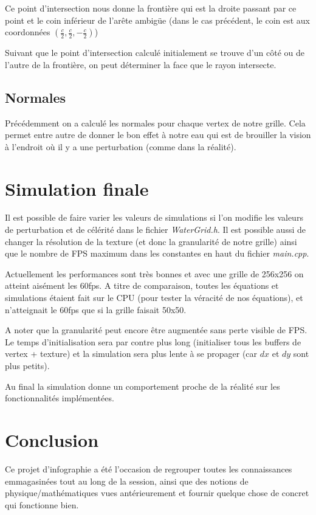 \documentclass[a4paper,11pt,leqno]{article}
\begin{document}
Ce point d'intersection nous donne la frontière qui est la droite passant par ce point et le coin inférieur de l'arête ambigüe (dans le cas précédent, le coin est aux coordonnées $(\frac{c}{2}, \frac{c}{2}, -\frac{c}{2})$)

Suivant que le point d'intersection calculé initialement se trouve d'un côté ou de l'autre de la frontière, on peut déterminer la face que le rayon intersecte.

\subsection{Normales}

Précédemment on a calculé les normales pour chaque vertex de notre grille. Cela permet entre autre de donner le bon effet à notre eau qui est de brouiller la vision à l'endroit où il y a une perturbation (comme dans la réalité).

\section{Simulation finale}

Il est possible de faire varier les valeurs de simulations si l'on modifie les valeurs de perturbation et de célérité dans le fichier \emph{WaterGrid.h}. Il est possible aussi de changer la résolution de la texture (et donc la granularité de notre grille) ainsi que le nombre de FPS maximum dans les constantes en haut du fichier \emph{main.cpp}.

Actuellement les performances sont très bonnes et avec une grille de 256x256 on atteint aisément les 60fps. 
A titre de comparaison, toutes les équations et simulations étaient fait sur le CPU (pour tester la véracité de nos équations), et n'atteignait le 60fps que si la grille faisait 50x50.

A noter que la granularité peut encore être augmentée sans perte visible de FPS. Le temps d'initialisation sera par contre plus long (initialiser tous les buffers de vertex + texture) et la simulation sera plus lente à se propager (car $dx$ et $dy$ sont plus petits).

Au final la simulation donne un comportement proche de la réalité sur les fonctionnalités implémentées.

\section{Conclusion}

Ce projet d'infographie a été l'occasion de regrouper toutes les connaissances emmagasinées tout au long de la session, ainsi que des notions de physique/mathématiques vues antérieurement et fournir quelque chose de concret qui fonctionne bien. 
\end{document}
